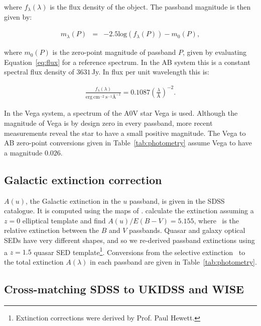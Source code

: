 \noindent where $f_\lambda(\lambda)$ is the flux density of the object. 
The passband magnitude is then given by:   

\begingroup\makeatletter{}\check@mathfonts
\begin{eqnarray}
\label{eq:mag}
  m_\lambda(P) & = & -2.5\text{log}(f_\lambda(P)) - m_0(P), 
\end{eqnarray}
\endgroup

\noindent where $m_0(P)$ is the zero-point magnitude of passband $P$, given by evaluating Equation~\ref{eq:flux} for a reference spectrum. 
In the AB system this is a constant spectral flux density of $3631$\,Jy. 
In flux per unit wavelength this is:  

\begingroup\makeatletter{}\check@mathfonts
\begin{eqnarray}
  \frac{f_\lambda(\lambda)}{\text{erg}~\text{cm}^{-2}~\text{s}^{-1} \text{\AA}^{-1}} = 0.1087 \left(\frac{\lambda}{\text{\AA}}\right)^{-2}.
\end{eqnarray}
\endgroup

\noindent In the Vega system, a spectrum of the A$0$V star Vega is used. 
Although the magnitude of Vega is by design zero in every passband, more recent measurements reveal the star to have a small positive magnitude. 
The Vega to AB zero-point conversions given in Table~\ref{tab:photometry} assume Vega to have a magnitude $0.026$. 

\subsection{Galactic extinction correction}

$A(u)$, the Galactic extinction in the $u$ passband, is given in the SDSS catalogue. 
It is computed using the maps of \citet{schlegel98}.
\citet{schlegel98} calculate the extinction assuming a $z=0$ elliptical template and find $A(u)/E(B-V)=5.155$, where \ebv\, is the relative extinction between the $B$ and $V$ passbands. 
Quasar and galaxy optical SEDs have very different shapes, and so we re-derived passband extinctions using a $z=1.5$ quasar SED template\footnote{Extinction corrections were derived by Prof. Paul Hewett.}.
Conversions from the selective extinction \ebv\, to the total extinction $A(\lambda)$ in each passband are given in Table~\ref{tab:photometry}.  
 
\subsection{Cross-matching SDSS to UKIDSS and WISE}


